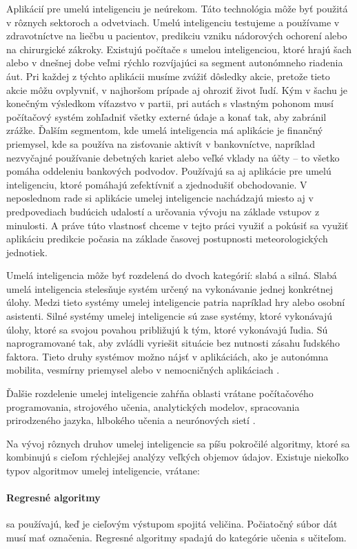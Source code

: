 Aplikácií pre umelú inteligenciu je neúrekom. Táto technológia môže byť použitá v rôznych sektoroch a odvetviach. Umelú inteligenciu testujeme a používame v zdravotníctve na liečbu u pacientov, predikciu vzniku nádorových ochorení alebo na chirurgické zákroky. Existujú počítače s umelou inteligenciou, ktoré hrajú šach alebo v dnešnej dobe veľmi rýchlo rozvíjajúci sa segment autonómneho riadenia áut. Pri každej z týchto aplikácii musíme zvážiť dôsledky akcie, pretože tieto akcie môžu ovplyvniť, v najhoršom prípade aj ohroziť život ľudí. Kým v šachu je konečným výsledkom víťazstvo v partii, pri autách s vlastným pohonom musí počítačový systém zohľadniť všetky externé údaje a konať tak, aby zabránil zrážke. Ďalším segmentom, kde umelá inteligencia má aplikácie je finančný priemysel, kde sa používa na zisťovanie aktivít v bankovníctve, napríklad nezvyčajné používanie debetných kariet alebo veľké vklady na účty – to všetko pomáha oddeleniu bankových podvodov. Používajú sa aj aplikácie pre umelú inteligenciu, ktoré pomáhajú zefektívniť a zjednodušiť obchodovanie. V neposlednom rade si aplikácie umelej inteligencie nachádzajú miesto aj v predpovediach budúcich udalostí a určovania vývoju na základe vstupov z minulosti. A práve túto vlastnosť chceme v tejto práci využiť a pokúsiť sa využiť aplikáciu predikcie počasia na základe časovej postupnosti meteorologických jednotiek.

Umelá inteligencia môže byť rozdelená do dvoch kategórií: slabá a silná. Slabá umelá inteligencia stelesňuje systém určený na vykonávanie jednej konkrétnej úlohy. Medzi tieto systémy umelej inteligencie patria napríklad hry alebo osobní asistenti. Silné systémy umelej inteligencie sú zase systémy, ktoré vykonávajú úlohy, ktoré sa svojou povahou približujú k tým, ktoré vykonávajú ľudia. Sú naprogramované tak, aby zvládli vyriešit situácie bez nutnosti zásahu ľudského faktora. Tieto druhy systémov možno nájsť v aplikáciách, ako je autonómna mobilita, vesmírny priemysel alebo v nemocničných aplikáciach \cite{ai1}.

Ďalšie rozdelenie umelej inteligencie zahŕňa oblasti vrátane počítačového programovania, strojového učenia, analytických modelov, spracovania prirodzeného jazyka, hlbokého učenia a neurónových sietí \cite{ai2}.

Na vývoj rôznych druhov umelej inteligencie sa píšu pokročilé algoritmy, ktoré sa kombinujú s cieľom rýchlejšej analýzy veľkých objemov údajov. Existuje niekoľko typov algoritmov umelej inteligencie, vrátane:
\paragraph{Regresné algoritmy} sa používajú, keď je cieľovým výstupom spojitá veličina. Počiatočný súbor dát musí mať označenia. Regresné algoritmy spadajú do kategórie učenia s učiteľom.

